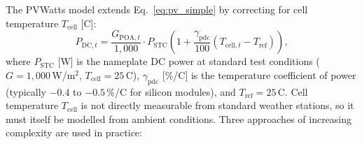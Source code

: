\documentclass[11pt,a4paper]{report}
\begin{document}
The PVWatts model \cite{Dobos2014PVWatts} extends Eq.~\eqref{eq:pv_simple} by correcting for cell temperature $T_{\text{cell}}$ [\textdegree C]:
\begin{equation}
    P_{\text{DC},t} = \frac{G_{\text{POA},t}}{1{,}000} \cdot P_{\text{STC}} \left(1 + \frac{\gamma_{\text{pdc}}}{100}\left(T_{\text{cell},t} - T_{\text{ref}}\right)\right),
    \label{eq:pvwatts}
\end{equation}
where $P_{\text{STC}}$ [W] is the nameplate DC power at standard test conditions ($G = 1{,}000$\,W/m$^2$, $T_{\text{cell}} = 25$\,\textdegree C), $\gamma_{\text{pdc}}$ [\%/\textdegree C] is the temperature coefficient of power (typically $-0.4$ to $-0.5$\,\%/\textdegree C for silicon modules), and $T_{\text{ref}} = 25$\,\textdegree C.
Cell temperature $T_{\text{cell}}$ is not directly measurable from standard weather stations, so it must itself be modelled from ambient conditions.
Three approaches of increasing complexity are used in practice:
\end{document}
